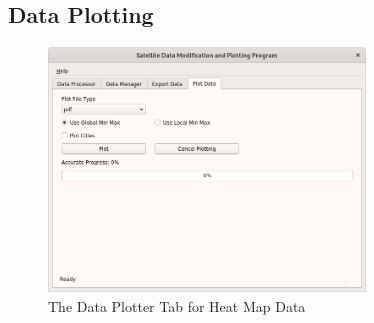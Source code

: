 \documentclass[../00_main.tex]{subfiles}
\begin{document}
\subsection{Data Plotting}

\begin{figure}[H]
    \center
    \includegraphics[width=0.75\textwidth]{../graphics/dpl01}
    \caption{The Data Plotter Tab for Heat Map Data}
    \label{dpl01}
\end{figure}
\end{document}
